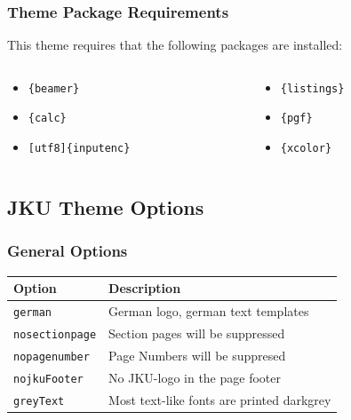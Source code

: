 \documentclass[aspectratio=169]{beamer}
\begin{document}
\begin{frame}[containsverbatim]
\frametitle{Theme Package Requirements}

This theme requires that the following packages are installed:

\begin{columns}[t]
\begin{column}{0.5\textwidth}
\begin{itemize}
\item \lstinline!{beamer}!
\item \lstinline!{calc}!
\item \lstinline![utf8]{inputenc}!
\end{itemize}
\end{column}

\begin{column}{0.5\textwidth}
\begin{itemize}
\item \lstinline!{listings}!
\item \lstinline!{pgf}!
\item \lstinline!{xcolor}!
\end{itemize}
\end{column}
\end{columns}
\end{frame}

\subsection{JKU Theme Options}


\begin{frame}
\frametitle{General Options}

\begin{table}[]
	\begin{tabularx}{\linewidth}{l>{\raggedright}X}
		\toprule
		\textbf{Option}			& \textbf{Description} \tabularnewline
		\midrule
		\texttt{german} & German logo, german text templates \tabularnewline
		\texttt{nosectionpage} & Section pages will be suppressed\tabularnewline
		\texttt{nopagenumber} & Page Numbers will be suppresed \tabularnewline
		\texttt{nojkuFooter} & No JKU-logo in the page footer \tabularnewline
		\texttt{greyText} & Most text-like fonts are printed darkgrey \tabularnewline
		\bottomrule
	\end{tabularx}
	\label{tab:options}
\end{table}
\end{frame}
\end{document}
